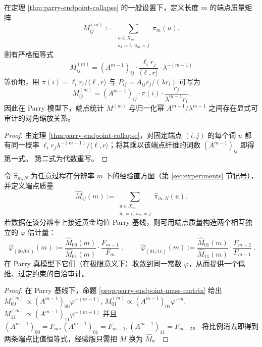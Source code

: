 \begin{proposition}\label{prop:parry-endpoint-mass-matrix}
在定理 \ref{thm:parry-endpoint-collapse} 的一般设置下，定义长度 \(m\) 的端点质量矩阵
\[
M^{(m)}_{ij}
:=
\sum_{\substack{u\in X_m\\ u_1=i,\ u_m=j}}\pi_m(u).
\]
则有严格恒等式
\[
\boxed{\;
M^{(m)}_{ij}
=
(A^{m-1})_{ij}\cdot \frac{\ell_i r_j}{\langle \ell,r\rangle}\cdot \lambda^{-(m-1)}\;}
\]
等价地，用 \(\pi(i)=\ell_i r_i/\langle \ell,r\rangle\) 与 \(P_{ij}=A_{ij}r_j/(\lambda r_i)\) 可写为
\[
M^{(m)}_{ij}
=(A^{m-1})_{ij}\cdot \pi(i)\cdot \frac{r_j}{\lambda^{m-1}r_i}.
\]
因此在 Parry 模型下，端点统计 \(M^{(m)}\) 与归一化幂 \(A^{m-1}/\lambda^{m-1}\) 之间存在显式可审计的对角缩放关系。
\end{proposition}
\begin{proof}
由定理 \ref{thm:parry-endpoint-collapse}，对固定端点 \((i,j)\) 的每个词 \(u\) 都有同一概率
\(\ell_i r_j\lambda^{-(m-1)}/\langle \ell,r\rangle\)；将其乘以该端点纤维的词数 \((A^{m-1})_{ij}\) 即得第一式。
第二式为代数重写。
\end{proof}

\begin{corollary}[由端点质量反推出黄金常数的过定约束估计]\label{cor:parry-endpoint-phi-estimators}
令 \(\hat\pi_{m,N}\) 为任意过程在分辨率 \(m\) 下的经验直方图（第 \ref{sec:experiments} 节记号），并定义端点质量
\[
\widehat M_{ij}(m):=\sum_{\substack{u\in X_m\\ u_1=i,\ u_m=j}}\hat\pi_{m,N}(u).
\]
若数据在该分辨率上接近黄金均值 Parry 基线，则可用端点质量构造两个相互独立的 \(\varphi\) 估计量：
\[
\boxed{\;
\widehat\varphi_{(00/01)}(m)
:=\frac{\widehat M_{00}(m)}{\widehat M_{01}(m)}\cdot \frac{F_{m-1}}{F_m}\;},
\qquad
\boxed{\;
\widehat\varphi_{(01/11)}(m)
:=\frac{\widehat M_{01}(m)}{\widehat M_{11}(m)}\cdot \frac{F_{m-2}}{F_{m-1}}\;}.
\]
在 Parry 真模型下它们（在极限意义下）收敛到同一常数 \(\varphi\)，从而提供一个低维、过定约束的自洽审计。
\end{corollary}
\begin{proof}
在 Parry 基线下，命题 \ref{prop:parry-endpoint-mass-matrix} 给出
\(
M^{(m)}_{00}\propto (A^{m-1})_{00}\varphi^{-(m-1)}\),
\(
M^{(m)}_{01}\propto (A^{m-1})_{01}\varphi^{-m}\),
\(
M^{(m)}_{11}\propto (A^{m-1})_{11}\varphi^{-(m+1)}
\)
并且 \((A^{m-1})_{00}=F_m,(A^{m-1})_{01}=F_{m-1},(A^{m-1})_{11}=F_{m-2}\)。
将比例消去即得到两条端点比值恒等式，经验版只需把 \(M\) 换为 \(\widehat M\)。
\end{proof}

